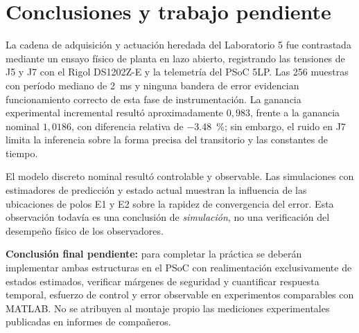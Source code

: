 \section{Conclusiones y trabajo pendiente}
La cadena de adquisición y actuación heredada del Laboratorio 5 fue
contrastada mediante un ensayo físico de planta en lazo abierto,
registrando las tensiones de J5 y J7 con el Rigol DS1202Z-E
y la telemetría del PSoC 5LP. Las 256 muestras con período mediano
de \SI{2}{\milli\second} y ninguna bandera de error evidencian
funcionamiento correcto de esta fase de instrumentación.
La ganancia experimental incremental resultó aproximadamente
$0{,}983$, frente a la ganancia nominal $1{,}0186$,
con diferencia relativa de \SI{-3,48}{\percent}; sin embargo,
el ruido en J7 limita la inferencia sobre la forma precisa
del transitorio y las constantes de tiempo.

El modelo discreto nominal resultó controlable y observable.
Las simulaciones con estimadores de predicción y estado actual
muestran la influencia de las ubicaciones de polos E1 y E2
sobre la rapidez de convergencia del error. Esta observación
todavía es una conclusión de \emph{simulación}, no una
verificación del desempeño físico de los observadores.

\textbf{Conclusión final pendiente:} para completar la práctica
se deberán implementar ambas estructuras en el PSoC con
realimentación exclusivamente de estados estimados, verificar
márgenes de seguridad y cuantificar respuesta temporal,
esfuerzo de control y error observable en experimentos
comparables con MATLAB. No se atribuyen al montaje propio
las mediciones experimentales publicadas en informes de
compañeros.
